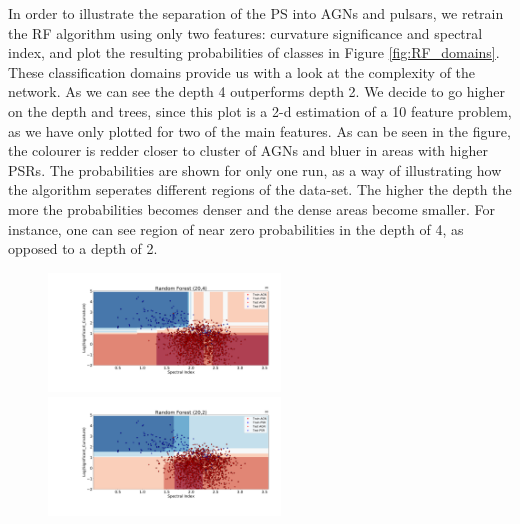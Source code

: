 In order to illustrate the separation of the PS into AGNs and pulsars, we retrain the RF algorithm using only two features: curvature significance and spectral index, and plot the resulting probabilities of classes in Figure \ref{fig:RF_domains}. These classification domains provide us with a look at the complexity of the network. As we can see the depth 4 outperforms depth 2. We decide to go higher on the depth and trees, since this plot is a 2-d estimation of a 10 feature problem, as we have only plotted for two of the main features. As can be seen in the figure, the colourer is redder closer to cluster of AGNs and bluer in areas with higher PSRs. The probabilities are shown for only one run, as a way of illustrating how the algorithm seperates different regions of the data-set. The higher the depth the more the probabilities becomes denser and the dense areas become smaller. For instance, one can see region of near zero probabilities in the depth of 4, as opposed to a depth of 2.  

\begin{figure}[h]
\centering
\hspace*{-2.5cm}
\includegraphics[width=0.55\textwidth,left]{plots/classification_domains/rf_20_4.pdf}
\hspace*{-2.5cm}
\includegraphics[width=0.55\textwidth,left]{plots/classification_domains/rf_20_2.pdf}
\end{figure}



